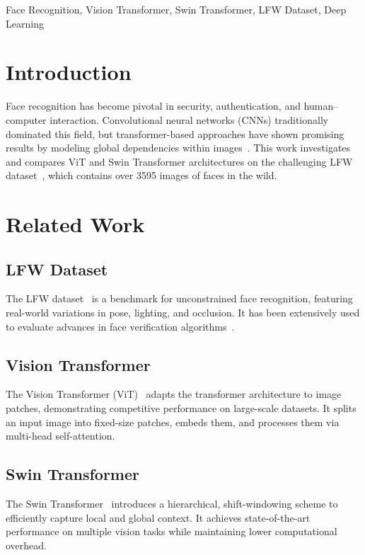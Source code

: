 \documentclass[twocolumn]{IEEEtran}
\begin{document}
\vspace{1em}

\noindent
\begin{IEEEkeywords}
Face Recognition, Vision Transformer, Swin Transformer, LFW Dataset, Deep Learning
\end{IEEEkeywords}

\section{Introduction}
\setlength{\parindent}{4em}
Face recognition has become pivotal in security, authentication, and human–computer interaction. Convolutional neural networks (CNNs) traditionally dominated this field, but transformer-based approaches have shown promising results by modeling global dependencies within images~\cite{dosovitskiy2020image}. This work investigates and compares ViT and Swin Transformer architectures on the challenging LFW dataset~\cite{huang2008lfw}, which contains over 3595 images of faces in the wild.

\section{Related Work}
\subsection{LFW Dataset}
\setlength{\parindent}{4em}
The LFW dataset~\cite{huang2008lfw} is a benchmark for unconstrained face recognition, featuring real-world variations in pose, lighting, and occlusion. It has been extensively used to evaluate advances in face verification algorithms~\cite{learned2016lfwweb}.

\subsection{Vision Transformer}
The Vision Transformer (ViT)~\cite{dosovitskiy2020image} adapts the transformer architecture to image patches, demonstrating competitive performance on large-scale datasets. It splits an input image into fixed-size patches, embeds them, and processes them via multi-head self-attention.

\subsection{Swin Transformer}
The Swin Transformer~\cite{liu2021swin} introduces a hierarchical, shift-windowing scheme to efficiently capture local and global context. It achieves state-of-the-art performance on multiple vision tasks while maintaining lower computational overhead.
\end{document}
